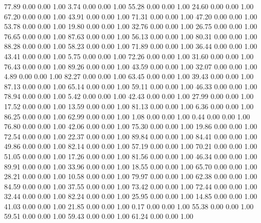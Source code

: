    77.89   0.00   0.00   1.00
    3.74   0.00   0.00   1.00
   55.28   0.00   0.00   1.00
   24.60   0.00   0.00   1.00
   67.20   0.00   0.00   1.00
   43.91   0.00   0.00   1.00
   71.31   0.00   0.00   1.00
   47.20   0.00   0.00   1.00
   53.78   0.00   0.00   1.00
   19.80   0.00   0.00   1.00
   32.76   0.00   0.00   1.00
   26.75   0.00   0.00   1.00
   76.65   0.00   0.00   1.00
   87.63   0.00   0.00   1.00
   56.13   0.00   0.00   1.00
   80.31   0.00   0.00   1.00
   88.28   0.00   0.00   1.00
   58.23   0.00   0.00   1.00
   71.89   0.00   0.00   1.00
   36.44   0.00   0.00   1.00
   43.41   0.00   0.00   1.00
    5.75   0.00   0.00   1.00
   72.26   0.00   0.00   1.00
   31.60   0.00   0.00   1.00
   76.43   0.00   0.00   1.00
   89.26   0.00   0.00   1.00
   43.59   0.00   0.00   1.00
   32.07   0.00   0.00   1.00
    4.89   0.00   0.00   1.00
   82.27   0.00   0.00   1.00
   63.45   0.00   0.00   1.00
   39.43   0.00   0.00   1.00
   87.13   0.00   0.00   1.00
   65.14   0.00   0.00   1.00
   59.11   0.00   0.00   1.00
   46.33   0.00   0.00   1.00
   78.94   0.00   0.00   1.00
    5.42   0.00   0.00   1.00
   42.43   0.00   0.00   1.00
   27.99   0.00   0.00   1.00
   17.52   0.00   0.00   1.00
   13.59   0.00   0.00   1.00
   81.13   0.00   0.00   1.00
    6.36   0.00   0.00   1.00
   86.25   0.00   0.00   1.00
   62.99   0.00   0.00   1.00
    1.08   0.00   0.00   1.00
    0.44   0.00   0.00   1.00
   76.80   0.00   0.00   1.00
   42.06   0.00   0.00   1.00
   75.30   0.00   0.00   1.00
   19.86   0.00   0.00   1.00
   72.54   0.00   0.00   1.00
   22.37   0.00   0.00   1.00
   89.84   0.00   0.00   1.00
   84.41   0.00   0.00   1.00
   49.86   0.00   0.00   1.00
   82.14   0.00   0.00   1.00
   57.19   0.00   0.00   1.00
   70.21   0.00   0.00   1.00
   51.05   0.00   0.00   1.00
   17.26   0.00   0.00   1.00
   81.56   0.00   0.00   1.00
   46.34   0.00   0.00   1.00
   89.91   0.00   0.00   1.00
   33.96   0.00   0.00   1.00
   18.55   0.00   0.00   1.00
   65.70   0.00   0.00   1.00
   28.21   0.00   0.00   1.00
   10.58   0.00   0.00   1.00
   79.97   0.00   0.00   1.00
   62.38   0.00   0.00   1.00
   84.59   0.00   0.00   1.00
   37.55   0.00   0.00   1.00
   73.42   0.00   0.00   1.00
   72.44   0.00   0.00   1.00
   32.44   0.00   0.00   1.00
   82.24   0.00   0.00   1.00
   25.95   0.00   0.00   1.00
   14.85   0.00   0.00   1.00
   41.03   0.00   0.00   1.00
   21.85   0.00   0.00   1.00
    0.17   0.00   0.00   1.00
   55.38   0.00   0.00   1.00
   59.51   0.00   0.00   1.00
   59.43   0.00   0.00   1.00
   61.24   0.00   0.00   1.00

